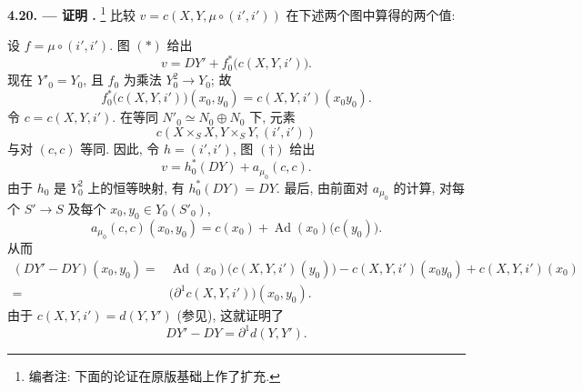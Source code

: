 \medskip
\noindent{}\textbf{4.20. --- 证明 .}
\footnote{编者注: 下面的论证在原版基础上作了扩充.}
比较 \(v=c(X,Y,\mu\circ(i',i'))\) 在下述两个图中算得的两个值:

\begin{center}
\end{center}

设 \(f=\mu\circ(i',i')\). 图 \((*)\) 给出
\begin{equation}
 v=DY'+f_0^*\bigl(c(X,Y,i')\bigr).
 \tag{1}\label{sga3:iii:paragraph:4-20:equation:1}
\end{equation}
现在 \(Y'_0=Y_0\), 且 \(f_0\) 为乘法
\(Y_0^2\to Y_0\); 故
\begin{equation}
 f_0^*\bigl(c(X,Y,i')\bigr)(x_0,y_0)
 =c(X,Y,i')(x_0y_0).
 \tag{2}\label{sga3:iii:paragraph:4-20:equation:2}
\end{equation}
令 \(c=c(X,Y,i')\). 在等同
\(N'_0\simeq N_0\oplus N_0\) 下, 元素
\[
 c(X\times_S X,Y\times_S Y,(i',i'))
\]
与对 \((c,c)\) 等同. 因此, 令 \(h=(i',i')\), 图 \((\dagger)\) 给出
\begin{equation}
 v=h_0^*(DY)+a_{\mu_0}(c,c).
 \tag{3}\label{sga3:iii:paragraph:4-20:equation:3}
\end{equation}
由于 \(h_0\) 是 \(Y_0^2\) 上的恒等映射, 有 \(h_0^*(DY)=DY\).
最后, 由前面对 \(a_{\mu_0}\) 的计算, 对每个 \(S'\to S\) 及每个
\(x_0,y_0\in Y_0(S'_0)\),
\begin{equation}
 a_{\mu_0}(c,c)(x_0,y_0)
 =c(x_0)+\operatorname{Ad}(x_0)\bigl(c(y_0)\bigr).
 \tag{4}\label{sga3:iii:paragraph:4-20:equation:4}
\end{equation}
从而
\begin{equation}
\begin{aligned}
 (DY'-DY)(x_0,y_0)
  ={}&\operatorname{Ad}(x_0)\bigl(c(X,Y,i')(y_0)\bigr)
      -c(X,Y,i')(x_0y_0)+c(X,Y,i')(x_0)\\
  ={}&\bigl(\partial^1c(X,Y,i')\bigr)(x_0,y_0).
\end{aligned}
\tag{5}\label{sga3:iii:paragraph:4-20:equation:5}
\end{equation}
由于 \(c(X,Y,i')=d(Y,Y')\)
(参见), 这就证明了
\[
 DY'-DY=\partial^1d(Y,Y').
\]

